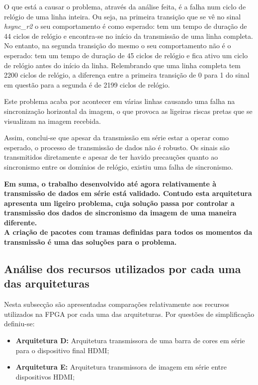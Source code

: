O que está a causar o problema, através da análise feita, é a falha num ciclo de relógio de uma linha inteira. Ou seja, na primeira transição que se vê no sinal \textit{hsync\_r2} o seu comportamento é como esperado: tem um tempo de duração de 44 ciclos de relógio e encontra-se no início da transmissão de uma linha completa. No entanto, na segunda transição do mesmo o seu comportamento não é o esperado: tem um tempo de duração de 45 ciclos de relógio e fica ativo um ciclo de relógio antes do início da linha. Relembrando que uma linha completa tem 2200 ciclos de relógio, a diferença entre a primeira transição de 0 para 1 do sinal em questão para a segunda é de 2199 ciclos de relógio. 

Este problema acaba por acontecer em várias linhas causando uma falha na sincronização horizontal da imagem, o que provoca as ligeiras riscas pretas que se visualizam na imagem recebida.


Assim, conclui-se que apesar da transmissão em série estar a operar como esperado, o processo de transmissão de dados não é robusto. Os sinais são transmitidos diretamente e apesar de ter havido precauções quanto ao sincronismo entre os domínios de relógio, existiu uma falha de sincronismo.

\begin{center}
	\lrboxbrace[\Vert][\Vert] {} {
\textbf{Em suma, o trabalho desenvolvido até agora relativamente à transmissão de dados em série está validado. Contudo esta arquitetura apresenta um ligeiro problema, cuja solução passa por controlar a transmissão dos dados de sincronismo da imagem de uma maneira diferente. \\ A criação de pacotes com tramas definidas para todos os momentos da transmissão é uma das soluções para o problema.}
}
\end{center}


\subsection{Análise dos recursos utilizados por cada uma das arquiteturas}

Nesta subsecção são apresentadas comparações relativamente aos recursos utilizados na FPGA por cada uma das arquiteturas. Por questões de simplificação definiu-se:
\begin{itemize}
	\item \textbf{Arquitetura D:} Arquitetura transmissora de uma barra de cores em série para o dispositivo final HDMI;
	\item \textbf{Arquitetura E:} Arquitetura transmissora de imagem em série entre dispositivos HDMI;
\end{itemize}

